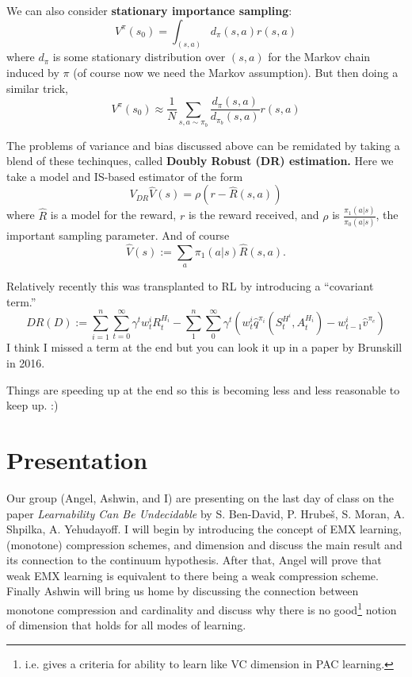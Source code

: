 \documentclass[12pt]{article}
\begin{document}
We can also consider \textbf{stationary importance sampling}: 
\[V^\pi(s_0)=\int_{(s,a)}d_\pi(s,a)r(s,a)\]
where $d_\pi$ is some stationary distribution over $(s,a)$ for the Markov chain induced by $\pi$ (of course now we need the Markov assumption). But then doing a similar trick,
\[V^\pi(s_0)\approx\frac{1}{N}\sum_{s,a\sim\pi_b}\frac{d_\pi(s,a)}{d_{\pi_b}(s,a)}r(s,a)\]

The problems of variance and bias discussed above can be remidated by taking a blend of these techinques, called \textbf{Doubly Robust (DR) estimation.} Here we take a model and IS-based estimator  of the form 
\[V_{DR}\hat V(s)=\rho(r-\hat R(s,a))\]
where $\hat R$ is a model for the reward, $r$ is the reward received, and $\rho$ is $\frac{\pi_1(a|s)}{\pi_0(a|s)}$, the important sampling parameter. And of course 
\[\hat V(s):=\sum_a\pi_1(a|s)\hat R(s,a).\]

Relatively recently this was transplanted to RL by introducing a ``covariant term.''
\[DR(D):=\sum_{i=1}^n\sum_{t=0}^\infty \gamma^tw_t^i R_t^{H_i}-\sum_{1}^n\sum_0^\infty\gamma^t(w_t^i\hat q^{\pi_i}(S_t^{H^i},A_t^{H_i})-w_{t-1}^i\hat v^{\pi_e})\]
I think I missed a term at the end but you can look it up in a paper by Brunskill in 2016.

Things are speeding up at the end so this is becoming less and less reasonable to keep up. :)



\section{Presentation}
Our group (Angel, Ashwin, and I) are presenting on the last day of class on the paper \textit{Learnability Can Be Undecidable} by S. Ben-David, P. Hrube\v s, S. Moran, A. Shpilka, A. Yehudayoff. I will begin 
by introducing the concept of EMX learning, (monotone) compression schemes, and dimension and discuss the main result and its connection to the continuum hypothesis. After that, Angel will prove that weak 
EMX learning is equivalent to there being a weak compression scheme. Finally Ashwin will bring us home by discussing the connection between monotone compression and cardinality and discuss why there is no
good\footnote{i.e. gives a criteria for ability to learn like VC dimension in PAC learning.} notion of dimension that holds for all modes of learning.
\end{document}
